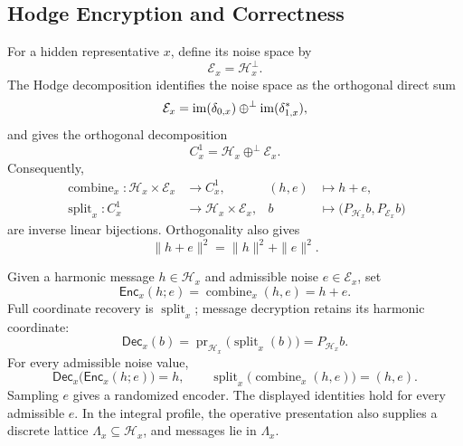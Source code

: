 \subsection{Hodge Encryption and Correctness}

For a hidden representative \(x\), define its noise space by
\[
  \mathcal E_x=\mathcal H_x^\perp.
\]
The Hodge decomposition identifies the noise space as the orthogonal direct
sum
\[
  \mathcal E_x
  =
  \operatorname{im}(\delta_{0,x})
  \oplus^\perp
  \operatorname{im}(\delta_{1,x}^{\ast}),
\]
and gives the orthogonal decomposition
\[
  C_x^1=\mathcal H_x\oplus^\perp\mathcal E_x.
\]
Consequently,
\[
\begin{aligned}
  \operatorname{combine}_x:
    \mathcal H_x\times\mathcal E_x&\longrightarrow C_x^1,
  &(h,e)&\longmapsto h+e,\\
  \operatorname{split}_x:C_x^1&\longrightarrow
    \mathcal H_x\times\mathcal E_x,
  &b&\longmapsto
    \bigl(P_{\mathcal H_x}b,P_{\mathcal E_x}b\bigr)
\end{aligned}
\]
are inverse linear bijections. Orthogonality also gives
\[
  \|h+e\|^2=\|h\|^2+\|e\|^2.
\]

Given a harmonic message \(h\in\mathcal H_x\) and admissible noise
\(e\in\mathcal E_x\), set
\[
  \mathsf{Enc}_x(h;e)=
  \operatorname{combine}_x(h,e)=h+e.
\]
Full coordinate recovery is \(\operatorname{split}_x\); message decryption
retains its harmonic coordinate:
\[
  \mathsf{Dec}_x(b)
  =
  \operatorname{pr}_{\mathcal H_x}
    \bigl(\operatorname{split}_x(b)\bigr)
  =
  P_{\mathcal H_x}b.
\]
For every admissible noise value,
\[
  \mathsf{Dec}_x\bigl(\mathsf{Enc}_x(h;e)\bigr)=h,
  \qquad
  \operatorname{split}_x\bigl(\operatorname{combine}_x(h,e)\bigr)=(h,e).
\]
Sampling \(e\) gives a randomized encoder. The displayed identities hold
for every admissible \(e\). In the integral profile, the operative
presentation also supplies a discrete lattice
\(\Lambda_x\subseteq\mathcal H_x\), and messages lie in \(\Lambda_x\).
